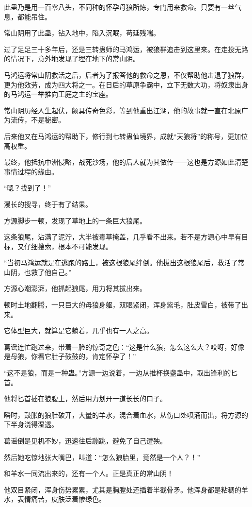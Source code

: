 \begin{this_body}
此蛊乃是用一百零八头，不同种的怀孕母狼所炼，专门用来救命。只要有一丝气息，都能吊住。

常山阴用了此蛊，钻入地中，陷入沉眠，苟延残喘。

过了足足三十多年后，还是三转蛊师的马鸿运，被狼群追击到这里来。在走投无路的情况下，意外地发现了埋在地下的常山阴。

马鸿运将常山阴救活之后，后者为了报答他的救命之恩，不仅帮助他击退了狼群，更为他效劳，成为四大将之一。在日后的草原争霸中，立下无数大功，将奴隶出身的马鸿运一举推向王庭之主的宝座。

常山阴历经人生起伏，颇具传奇色彩，等到他重出江湖，他的故事就一直在北原广为流传，不是秘密。

后来他又在马鸿运的帮助下，修行到七转蛊仙境界，成就“天狼将”的称号，更加位高权重。

最终，他抵抗中洲侵略，战死沙场，他的后人就为其做传――这也是方源如此清楚事情过程的缘由。

“嗯？找到了！”

漫长的搜寻，终于有了结果。

方源脚步一顿，发现了草地上的一条巨大狼尾。

这条狼尾，沾满了泥泞，大半被毒草掩盖，几乎看不出来。若不是方源心中早有目标，又仔细搜索，根本不可能发现。

“当初马鸿运就是在逃跑的路上，被这根狼尾绊倒。他拔出这根狼尾后，救活了常山阴，也救了他自己。”

方源心潮澎湃，他抓起狼尾，用力将其拔出来。

顿时土地翻腾，一只巨大的母狼身躯，双眼紧闭，浑身紫毛，肚皮雪白，被带了出来。

它体型巨大，就算是它躺着，几乎也有一人之高。

葛谣连忙跑过来，带着一脸的惊奇之色：“这是什么狼，怎么这么大？哎呀，好像是母狼，你看它肚子鼓鼓的，肯定怀孕了！”

“这不是狼，而是一种蛊。”方源一边说着，一边从推杯换盏蛊中，取出锋利的匕首。

他将匕首插在狼腹上，然后用力划开一道长长的口子。

瞬时，鼓胀的狼肚破开，大量的羊水，混合着血水，从伤口处喷涌而出，将方源的下半身浇得湿透。

葛谣倒是见机不妙，迅速往后蹦跳，避免了自己遭殃。

然后她吃惊地张大嘴巴，叫道：“怎么狼胎里，竟然是一个人？！”

和羊水一同流出来的，还有一个人。正是真正的常山阴！

他双目紧闭，浑身伤势累累，尤其是胸膛处还插着半截骨矛。他浑身都是粘稠的羊水，表情痛苦，皮肤泛着惨绿色。


\end{this_body}
